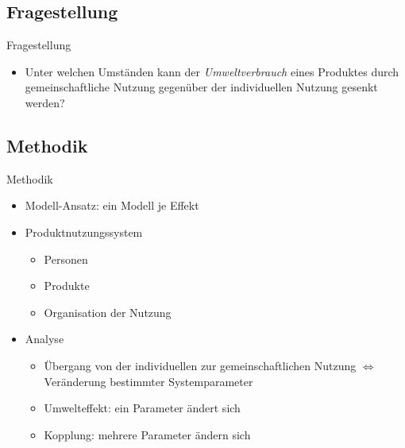 \documentclass[beamer, xcolor={table,usenames,dvipsnames}]{beamer}
\begin{document}
    \subsection{Fragestellung}
	\begin{frame}{Fragestellung}
      \begin{block}{}
	        	\begin{itemize}
	        		\item[] Unter welchen Umständen kann der \textit{Umweltverbrauch} eines Produktes durch gemeinschaftliche Nutzung gegenüber der individuellen Nutzung gesenkt werden?
	        	\end{itemize}
      \end{block}
	\end{frame}

    \subsection{Methodik}
	\begin{frame}{Methodik}
            \begin{itemize}
                \pause
                \item Modell-Ansatz: ein Modell je Effekt
                \pause
                \item Produktnutzungssystem
                \begin{itemize}
                    \item Personen 
                    \item Produkte
                    \item Organisation der Nutzung
                \end{itemize}
                \pause
                \item Analyse
                \begin{itemize}
                    \item Übergang von der individuellen zur gemeinschaftlichen Nutzung $\Leftrightarrow$ Veränderung bestimmter Systemparameter
                    \item Umwelteffekt: ein Parameter ändert sich
                    \item Kopplung: mehrere Parameter ändern sich
                \end{itemize}
            \end{itemize}
	\end{frame}
\end{document}

